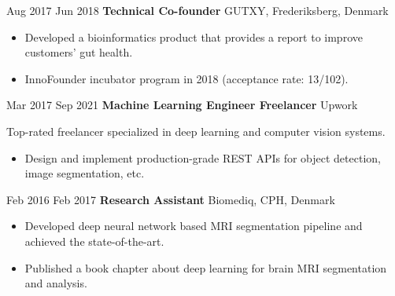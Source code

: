 \documentclass[11pt]{article} %
\begin{document}
{\job
{Aug 2017 }{Jun 2018}
{\textbf{Technical Co-founder}}
{}
{GUTXY, Frederiksberg, Denmark}
{
	\begin{itemize}[itemsep=0pt]
		\item Developed a bioinformatics product that provides a report to improve customers’ gut health.
		\item InnoFounder incubator program in 2018 (acceptance rate: 13/102).
	\end{itemize}
}

\job
{Mar 2017 }{Sep 2021}
{\textbf{Machine Learning Engineer Freelancer}}
{}
{Upwork}
{
	Top-rated freelancer specialized in deep learning and computer vision systems.
		\begin{itemize}[itemsep=0pt]
			\item Design and implement production-grade REST APIs for object detection, image segmentation, etc.
		\end{itemize}
}


\job
{Feb 2016 }{Feb 2017}
{\textbf{Research Assistant}}
{}
{Biomediq, CPH, Denmark}
{
		\begin{itemize}[itemsep=0pt]
			\item Developed deep neural network based MRI segmentation pipeline and achieved the state-of-the-art.
			\item Published a book chapter about deep learning for brain MRI segmentation and analysis.
		\end{itemize}
}

}
\end{document}
